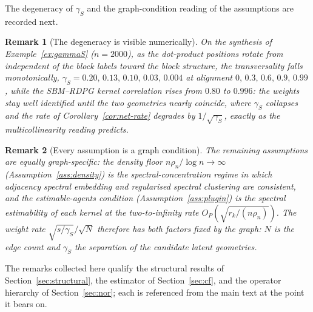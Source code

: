 \documentclass[12pt]{article}
\makeatletter
\newtheorem{remark}{Remark}
\def\subsection{\@startsection{subsection}{2}{\z@}{-0.13in}{0.03in}{\normalsize\bf\raggedright}}
\newcommand{\1}{\mathbf{1}}
\makeatother
\begin{document}
The degeneracy of $\gamma_S$ and the graph-condition reading of the assumptions are recorded next.

\begin{remark}[The degeneracy is visible numerically]
\label{rem:gammaS-degeneracy}
On the synthesis of Example~\ref{ex:gammaS} ($n=2000$), as the dot-product positions rotate from independent
of the block labels toward the block structure, the transversality falls monotonically,
$\gamma_S=0.20,\,0.13,\,0.10,\,0.03,\,0.004$ at alignment $0,\,0.3,\,0.6,\,0.9,\,0.99$, while the SBM--RDPG
kernel correlation rises from $0.80$ to $0.996$: the weights stay well identified until the two geometries
nearly coincide, where $\gamma_S$ collapses and the rate of Corollary~\ref{cor:net-rate} degrades by
$1/\sqrt{\gamma_S}$, exactly as the multicollinearity reading predicts.
\end{remark}

\begin{remark}[Every assumption is a graph condition]
\label{rem:assumptions-network}
The remaining assumptions are equally graph-specific: the density floor $n\rho_n/\log n\to\infty$
(Assumption~\ref{ass:density}) is the spectral-concentration regime in which adjacency spectral embedding and
regularised spectral clustering are consistent, and the estimable-agents condition (Assumption~\ref{ass:plugin})
is the spectral estimability of each kernel at the two-to-infinity rate $O_P(\sqrt{r_k/(n\rho_n)})$. The weight
rate $\sqrt{s/\gamma_S}/\sqrt{N}$ therefore has both factors fixed by the graph: $N$ is the edge count and
$\gamma_S$ the separation of the candidate latent geometries.
\end{remark}

\subsection{Additional remarks}
The remarks collected here qualify the structural results of Section~\ref{sec:structural}, the estimator of
Section~\ref{sec:cf}, and the operator hierarchy of Section~\ref{sec:nor}; each is referenced from the main
text at the point it bears on.
\end{document}
